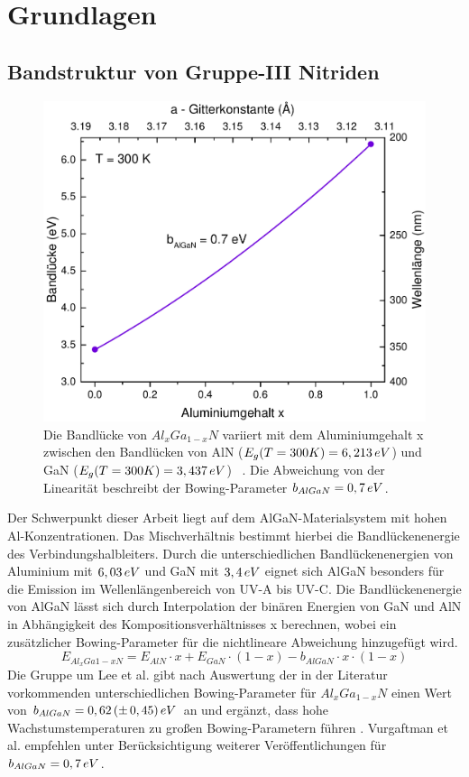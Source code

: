 \chapter{Grundlagen}
\thispagestyle{fancy}

\section{Bandstruktur von Gruppe-III Nitriden}
\begin{figure}[!htb]
    \centering
    \begin{minipage}[t]{\linewidth}
        \centering
        \includegraphics[width=0.5\linewidth]{Bilder/bandluecke.pdf}
        \caption{Die Bandlücke von $Al_{x}Ga_{1-x}N$ variiert mit dem Aluminiumgehalt x zwischen den Bandlücken von AlN ($E_{g}(T = 300 K) = 6,213 \thinspace eV$) und GaN ($E_{g}(T = 300 K) = 3,437 \thinspace  eV$) ~\cite{pipr}. Die Abweichung von der Linearität beschreibt der Bowing-Parameter $b_{AlGaN} = 0,7 \thinspace eV$.} 
        \label{fig:wurtz}
    \end{minipage}%
\end{figure}
\noindent
Der Schwerpunkt dieser Arbeit liegt auf dem AlGaN-Materialsystem mit hohen Al-Konzentrationen. Das Mischverhältnis bestimmt hierbei die Bandlückenenergie des Verbindungshalbleiters. Durch die unterschiedlichen Bandlückenenergien von Aluminium mit $6,03 \thinspace eV$\cite{fenaln} und GaN mit $3,4 \thinspace eV$ \cite{pipr} eignet sich AlGaN besonders für die Emission im Wellenlängenbereich von UV-A bis UV-C. 
Die Bandlückenenergie von AlGaN lässt sich durch Interpolation der binären Energien von GaN und AlN in Abhängigkeit des Kompositionsverhältnisses x berechnen, wobei ein zusätzlicher Bowing-Parameter für die nichtlineare Abweichung hinzugefügt wird. 
%
\begin{equation}
    E_{Al_{x}Ga{1-x}N} = E_{AlN} \cdot x + E_{GaN} \cdot (1-x) - b_{AlGaN} \cdot x \cdot (1-x) 
\end{equation}
%
Die Gruppe um Lee et al. gibt nach Auswertung der in der Literatur vorkommenden unterschiedlichen Bowing-Parameter für $Al_{x}Ga_{1-x}N$ einen Wert von $b_{AlGaN} = 0,62\thinspace(\pm \thinspace 0,45)\thinspace eV$ an und ergänzt, dass hohe Wachstumstemperaturen zu großen Bowing-Parametern führen \cite{doi:10.1063/1.123339}.
Vurgaftman et al. empfehlen unter Berücksichtigung weiterer Veröffentlichungen für $b_{AlGaN} =  0,7 \thinspace eV$.



